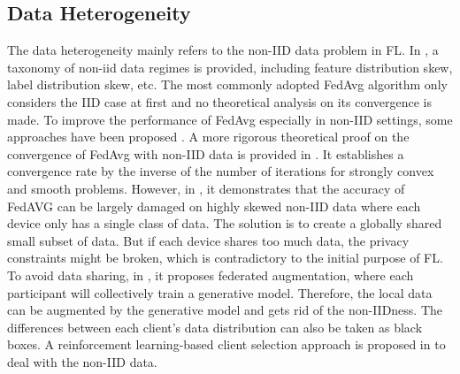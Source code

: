\documentclass[11pt]{article}
\newcommand{\etc}{etc.\xspace}
\begin{document}
\subsection{Data Heterogeneity}
The data heterogeneity mainly refers to the non-IID data problem in FL.
In \cite{DBLP:journals/corr/abs-1912-04977}, a taxonomy of non-iid data regimes is provided, including feature distribution skew, label distribution skew, \etc
The most commonly adopted FedAvg \cite{DBLP:conf/aistats/McMahanMRHA17} algorithm only considers the IID case at first and no theoretical analysis on its convergence is made.
To improve the performance of FedAvg especially in non-IID settings, some approaches have been proposed \cite{DBLP:conf/nips/SmithCST17, DBLP:conf/icml/YurochkinAGGHK19, DBLP:conf/iclr/WangYSPK20}.
A more rigorous theoretical proof on the convergence of FedAvg with non-IID data is provided in \cite{DBLP:conf/iclr/LiHYWZ20}. It establishes a convergence rate by the inverse of the number of iterations for strongly convex and smooth problems.
However, in \cite{DBLP:journals/corr/abs-1806-00582}, it demonstrates that the accuracy of FedAVG can be largely damaged on highly skewed non-IID data where each device only has a single class of data. %
The solution is to create a globally shared small subset of data. But if each device shares too much data, the privacy constraints might be broken, which is contradictory to the initial purpose of FL.
To avoid data sharing, in \cite{DBLP:journals/corr/abs-1811-11479}, it proposes federated augmentation, where each participant will collectively train a generative model. Therefore, the local data can be augmented by the generative model and gets rid of the non-IIDness. 
The differences between each client's data distribution can also be taken as black boxes. A reinforcement learning-based client selection approach is proposed in \cite{DBLP:conf/infocom/WangKNL20} to deal with the non-IID data. 
\end{document}
